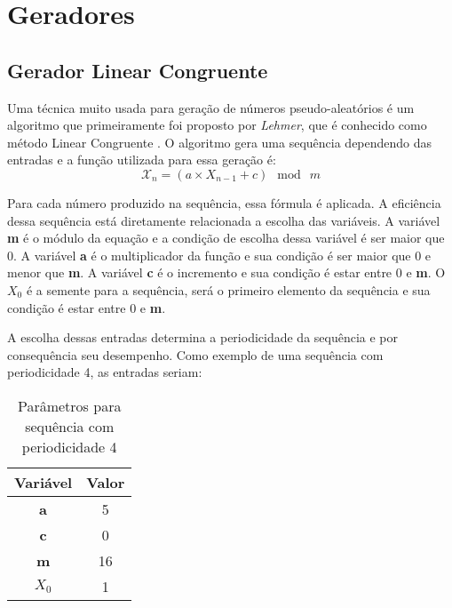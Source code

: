 

\section{Geradores}
\subsection{Gerador Linear Congruente}

Uma técnica muito usada para geração de números pseudo-aleatórios é um algoritmo que primeiramente foi proposto por \textit{Lehmer}, que é conhecido como método Linear Congruente \cite{william-stallings}. O algoritmo gera uma sequência dependendo das entradas e a função utilizada para essa geração é:
\begin{equation}
	\label{Função para geração de números aleatórios.}
	\mathcal{X}_n = (a \times X_{n - 1} + c)\: \bmod \: m	
\end{equation}

Para cada número produzido na sequência, essa fórmula é aplicada. A eficiência dessa sequência está diretamente relacionada a escolha das variáveis. A variável \textbf{m} é o módulo da equação e a condição de escolha dessa variável é ser maior que 0. A variável \textbf{a} é o multiplicador da função e sua condição é ser maior que 0 e menor que \textbf{m}. A variável \textbf{c} é o incremento e sua condição é estar entre 0 e \textbf{m}. O \textbf{$X_0$} é a semente para a sequência, será o primeiro elemento da sequência e sua condição é estar entre 0 e \textbf{m}.

A escolha dessas entradas determina a periodicidade da sequência e por consequência seu desempenho. Como exemplo de uma sequência com periodicidade 4, as entradas seriam:

\begin{table}[h]
	\centering
	\begin{tabular}{ c c }	
	\toprule
		Variável & Valor \\ \hline
		\textbf{a} & 5 \\ \hline
		\textbf{c} & 0 \\ \hline
		\textbf{m} & 16 \\ \hline
		\textbf{$X_0$} & 1 \\ \hline
	\end{tabular}
	\caption{Parâmetros para sequência com periodicidade 4}
\end{table}

